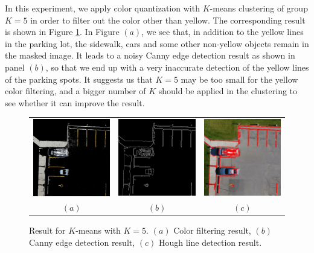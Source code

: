 \documentclass{m2pi}
\begin{document}
In this experiment, we apply color quantization with $K$-means clustering of 
group $K=5$ in order to filter out the color other than yellow. 
The corresponding result is shown in Figure 
\ref{lot1k5}. In Figure $(a)$, we see that, in addition to the 
yellow lines in the parking lot, the sidewalk, cars and some other non-yellow
objects remain in the masked image. It leads to a noisy Canny edge detection
result as shown in panel $(b)$, so that we end up with a very inaccurate detection
of the yellow lines of the parking spots. It suggests us that $K=5$ may be too
small for the yellow color filtering, and a bigger number of $K$ should 
be applied 
in the clustering to see whether it can improve the result.

\begin{figure}[htp]\label{parking_lot_9}
\centering
\begin{tabular}{ccc}
\includegraphics[width=3.8cm]{figures/Masked_Lot1k5.jpg}&
\includegraphics[width=3.8cm]{figures/Edge_Lot1k5.jpg}&
\includegraphics[width=3.8cm]{figures/Detected_Lot1k5.jpg}\\
$(a)$ & $(b)$ & $(c)$
\end{tabular}
\caption{Result for $K$-means with $K=5$. 
$(a)$ Color filtering result, 
$(b)$ Canny edge detection result,
$(c)$ Hough line detection result.}
\label{lot1k5}
\end{figure}
\end{document}
